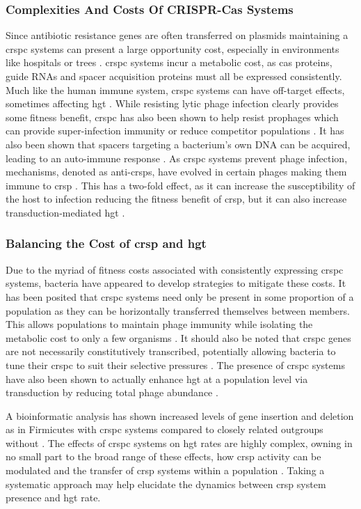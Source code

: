 \subsubsection{Complexities And Costs Of CRISPR-Cas Systems}
Since antibiotic resistance genes are often transferred on plasmids maintaining a \ac{crspc} systems can present a large opportunity cost, especially in environments like hospitals or trees \citep{hospital}.
\ac{crspc} systems incur a metabolic cost, as \ac{cas} proteins, guide RNAs and  spacer acquisition proteins must all be expressed consistently\citep{crispgen}.
Much like the human immune system, \ac{crspc} systems can have off-target effects, sometimes affecting \ac{hgt} \citep{acqorres}.
While resisting lytic phage infection clearly provides some fitness benefit, \ac{crspc} has also been shown to help resist prophages which can provide super-infection immunity or reduce competitor populations \citep{acqorres,transhgt}.
It has also been shown that spacers targeting a bacterium's own DNA can be acquired, leading to an auto-immune response \citep{selfcrisp}.
As \ac{crspc} systems prevent phage infection, mechanisms, denoted as anti-\ac{crsp}s, have evolved in certain phages making them immune to \ac{crsp} \citep{acqorres}.
This has a two-fold effect, as it can increase the susceptibility of the host to infection reducing the fitness benefit of \ac{crsp}, but it can also increase transduction-mediated \ac{hgt} \citep{acqorres}.
\subsubsection{Balancing the Cost of \ac{crsp} and \ac{hgt}}
Due to the myriad of fitness costs associated with consistently expressing \ac{crspc} systems, bacteria have appeared to develop strategies to mitigate these costs.
It has been posited that \ac{crspc} systems need only be present in some proportion of a population as they can be horizontally transferred themselves between members\citep{crisprlgt}.
This allows populations to maintain phage immunity while isolating the metabolic cost to only a few organisms \citep{acqorres}.
It should also be noted that \ac{crspc} genes are not necessarily constitutively transcribed, potentially allowing bacteria to tune their \ac{crspc} to suit their selective pressures \citep{acqorres}.
The presence of \ac{crspc} systems have also been shown to actually enhance \ac{hgt} at a population level via transduction by reducing total phage abundance \citep{transhgt}.\par
A bioinformatic analysis has shown increased levels of gene insertion and deletion as in Firmicutes with \ac{crspc} systems compared to closely related outgroups without \citep{athena}.
The effects of \ac{crspc} systems on \ac{hgt} rates are highly complex, owning in no small part to the broad range of these effects, how \ac{crsp} activity can be modulated and the transfer of \ac{crsp} systems within a population \citep{acqorres}.
Taking a systematic approach may help elucidate the dynamics between \ac{crsp} system presence and \ac{hgt} rate.

